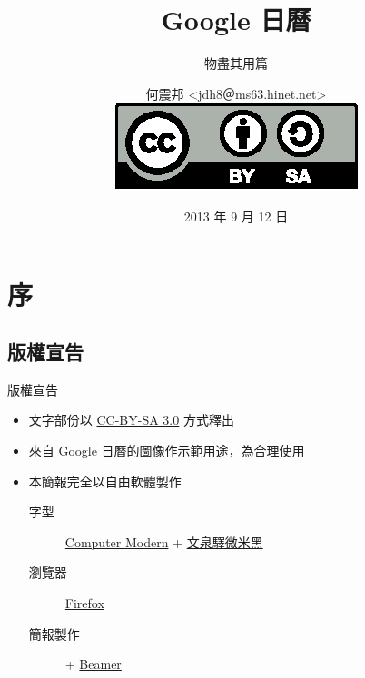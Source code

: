 \documentclass{beamer}
\title{Google 日曆}
\subtitle{物盡其用篇}
\author[何震邦]{何震邦 \textless jdh8＠ms63.hinet.net\textgreater\\[1em]
    \href{https://creativecommons.org/licenses/by-sa/3.0/tw/deed}{\includegraphics{by-sa.eps}}}
\date{2013 年 9 月 12 日}
\begin{document}
\maketitle

\section{序}
\subsection{版權宣告}
\begin{frame}{版權宣告}
  \begin{itemize}
    \item 文字部份以 \href{https://creativecommons.org/licenses/by-sa/3.0/tw/deed}{CC-BY-SA 3.0} 方式釋出
    \item 來自 Google 日曆的圖像作示範用途，為合理使用
    \item 本簡報完全以自由軟體製作
    \begin{description}
      \item[字型] \href{https://zh.wikipedia.org/wiki/Computer\textunderscore Modern}{Computer Modern} +
        \href{http://wenq.org/wqy2/index.cgi?MicroHei}{文泉驛微米黑}
      \item[瀏覽器] \href{https://mozilla.com.tw/}{Firefox}
      \item[簡報製作] \href{http://www.xelatex.org/}{\XeLaTeX} + \href{https://zh.wikipedia.org/wiki/Beamer\textunderscore\%28LaTeX\%29}{Beamer}
    \end{description}
  \end{itemize}
\end{frame}
\end{document}
